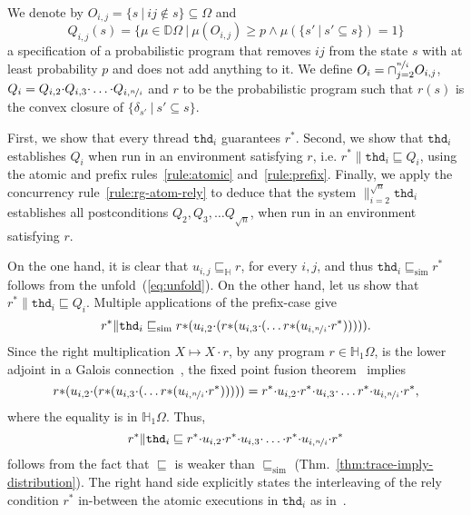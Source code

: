 \documentclass[review]{elsart}
\newcommand{\D}{\mathbb{D}}
\renewcommand{\H}{\mathbb{H}}
\newcommand{\bks}{*}
\newcommand{\refby}{\sqsubseteq}
\newcommand{\refbyh}{\sqsubseteq_{\mathbb{H}}}
\newcommand{\simref}{\refby_{\mathrm{sim}}}
\newcommand{\thread}{\mathtt{thd}}
\newcommand{\Thm}[1]{Thm.~\ref{#1}}
\begin{document}
We denote by $O_{i,j} = \{s\ |\ ij{\notin} s\}\subseteq\Omega$ and 
\[
	Q_{i,j}(s) = \{\mu{\in}\D\Omega \ |\ \mu(O_{i,j}){\geq} p\wedge \mu(\{s'\ | \ s'{\subseteq} s\}) {=} 1\}
\]
a specification of a probabilistic program that removes $ij$ from the state $s$ with at least probability $p$ and does not add anything to it. We define $O_i = {\cap}_{j=2}^{\nicefrac{n}{i}} O_{i,j}$, $Q_i = Q_{i,2}{\cdot} Q_{i,3}{\cdot}\dots{\cdot} Q_{i,\nicefrac{n}{i}}$ and $r$ to be the probabilistic program such that $r(s)$ is the convex closure of $\{\delta_{s'} \ |\ s'{\subseteq} s\}$. 

First, we show that every thread $\thread_i$ guarantees $r^{\bks}$. Second, we show that $\thread_i$ establishes $Q_i$ when run in an environment satisfying $r$, i.e. $r^{\bks}\|\thread_i\refby Q_i$, using the atomic and prefix rules~\ref{rule:atomic} and~\ref{rule:prefix}. Finally, we  apply the concurrency rule~\ref{rule:rg-atom-rely} to deduce that the system $\|_{i=2}^{\sqrt n}\thread_i$ establishes all postconditions $Q_2,Q_3,\dots Q_{\sqrt n}$, when run in an environment satisfying $r$.

\noindent{\textbf{Establising $\thread_i\simref r^{\bks}$ and $r^{\bks}\|\thread_i\refby Q_i$}}
 
On the one hand, it is clear that $u_{i,j}\refbyh r$, for every $i,j$, and thus $\thread_i\simref r^{\bks}$ follows from the unfold~(\ref{eq:unfold}). On the other hand, let us show that $r^{\bks}\|\thread_i\refby Q_i$. Multiple applications of the prefix-case give 
\[
	r^{\bks}\|\thread_i \simref r{\bks}(u_{i,2}{\cdot} (r{\bks} (u_{i,3}{\cdot}(\dots r{\bks} (u_{i,\nicefrac{n}{i}}{\cdot} r^{\bks}))))).
\]
Since the right multiplication $X\mapsto X{\cdot} r$, by any program $r{\in}\H_1\Omega$, is the lower adjoint in a Galois connection~\cite{Mci04}, the fixed point fusion theorem~\cite{Bac02} implies  
\[
	r{\bks}(u_{i,2}{\cdot} (r{\bks} (u_{i,3}{\cdot}(\dots r{\bks} (u_{i,\nicefrac{n}{i}}{\cdot }r^{\bks}))))) = r^{\bks}{\cdot} u_{i,2}{\cdot} r^{\bks}{\cdot} u_{i,3}{\cdot}\dots r^{\bks}{\cdot} u_{i,\nicefrac{n}{i}}{\cdot} r^{\bks},
\]
where the equality is in $\H_1\Omega$. Thus, 
\[
	r^{\bks}\|\thread_i \refby r^{\bks}{\cdot} u_{i,2}{\cdot} r^{\bks}{\cdot} u_{i,3}{\cdot}\dots{\cdot} r^{\bks}{\cdot} u_{i,\nicefrac{n}{i}}{\cdot} r^{\bks}
\]
follows from the fact that $\refby$ is weaker than $\simref$ (\Thm{thm:trace-imply-distribution}). The right hand side explicitly  states the interleaving of the rely condition $r^{\bks}$ in-between the atomic executions in $\thread_i$ as in~\cite{Jon12}. 
\end{document}
